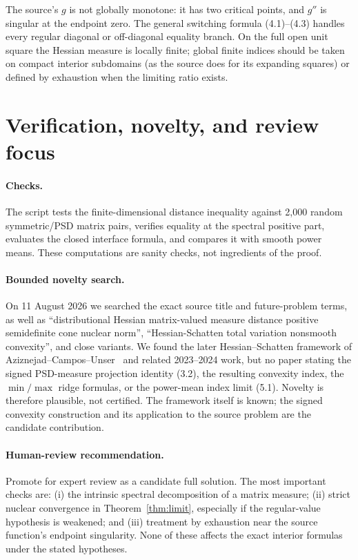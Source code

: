 \documentclass[11pt]{article}
\begin{document}
The source's \(g\) is not globally monotone: it has two critical points, and
\(g''\) is singular at the endpoint zero.  The general switching formula
(4.1)--(4.3) handles every regular diagonal or off-diagonal equality branch.
On the full open unit square the Hessian measure is locally finite; global
finite indices should be taken on compact interior subdomains (as the source
does for its expanding squares) or defined by exhaustion when the limiting
ratio exists.

\section{Verification, novelty, and review focus}

\paragraph{Checks.}
The script tests the finite-dimensional distance inequality against 2,000
random symmetric/PSD matrix pairs, verifies equality at the spectral positive
part, evaluates the closed interface formula, and compares it with smooth
power means.  These computations are sanity checks, not ingredients of the
proof.

\paragraph{Bounded novelty search.}
On 11 August 2026 we searched the exact source title and future-problem terms,
as well as ``distributional Hessian matrix-valued measure distance positive
semidefinite cone nuclear norm'', ``Hessian-Schatten total variation
nonsmooth convexity'', and close variants.  We found the later
Hessian--Schatten framework of Aziznejad--Campos--Unser~\cite{ACU} and related
2023--2024 work, but no paper stating the signed PSD-measure projection
identity (3.2), the resulting convexity index, the \(\min/\max\) ridge formulas,
or the power-mean index limit (5.1).  Novelty is therefore plausible, not
certified.  The framework itself is known; the signed convexity construction
and its application to the source problem are the candidate contribution.

\paragraph{Human-review recommendation.}
Promote for expert review as a candidate full solution.  The most important
checks are: (i) the intrinsic spectral decomposition of a matrix measure;
(ii) strict nuclear convergence in Theorem~\ref{thm:limit}, especially if the
regular-value hypothesis is weakened; and (iii) treatment by exhaustion near
the source function's endpoint singularity.  None of these affects the exact
interior formulas under the stated hypotheses.
\end{document}
